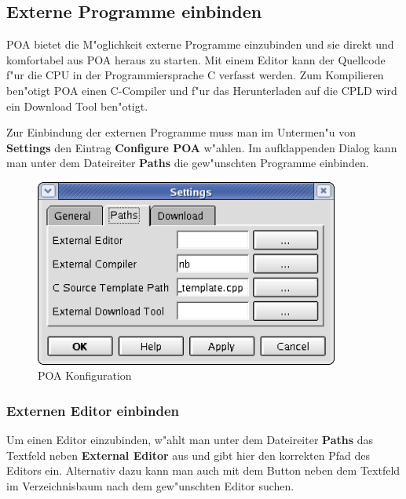 \documentclass[a4paper,titlepage,12pt,ngerman]{scrbook}
\begin{document}
\subsection{Externe Programme einbinden}
POA bietet die M"oglichkeit externe Programme einzubinden und sie direkt und komfortabel aus POA heraus zu starten. Mit einem Editor kann der Quellcode f"ur die CPU in der Programmiersprache C  verfasst werden. Zum Kompilieren ben"otigt POA einen C-Compiler und f"ur das Herunterladen auf die CPLD wird ein Download Tool ben"otigt.\par
Zur Einbindung der externen Programme muss man im Untermen"u von {\bf Settings} den Eintrag {\bf Configure POA} w"ahlen. Im aufklappenden Dialog kann man unter dem Dateireiter {\bf Paths} die gew"unschten Programme einbinden.

\begin{figure}[htbp]

\begin{center}

\includegraphics[width=10cm]{POAConfiguration2}

\caption{POA Konfiguration}\label{test}

\end{center}

\end{figure}

\subsubsection{Externen Editor einbinden}
Um einen Editor einzubinden, w"ahlt man unter dem Dateireiter {\bf Paths} das Textfeld neben {\bf External Editor} aus und gibt hier den korrekten Pfad des Editors ein. Alternativ dazu kann man auch mit dem Button neben dem Textfeld im Verzeichnisbaum nach dem gew"unschten Editor suchen.\par
\end{document}
